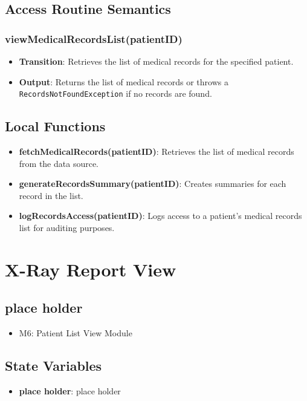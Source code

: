 \documentclass[12pt, titlepage]{article}
\begin{document}
\subsection{Access Routine Semantics}
\subsubsection{viewMedicalRecordsList(patientID)}
\begin{itemize}
    \item \textbf{Transition}: Retrieves the list of medical records for the specified patient.
    \item \textbf{Output}: Returns the list of medical records or throws a \texttt{RecordsNotFoundException} if no records are found.
\end{itemize}

\subsection{Local Functions}
\begin{itemize}
\item \textbf{fetchMedicalRecords(patientID)}: Retrieves the list of medical records from the data source.
\item \textbf{generateRecordsSummary(patientID)}: Creates summaries for each record in the list.
\item \textbf{logRecordsAccess(patientID)}: Logs access to a patient's medical records list for auditing purposes.
\end{itemize}

\section{X-Ray Report View}

\subsection{place holder}
\begin{itemize}
  \item M6: Patient List View Module
\end{itemize}

\subsection{State Variables}
\begin{itemize}
\item \textbf{place holder}: place holder
\end{itemize}
\end{document}
